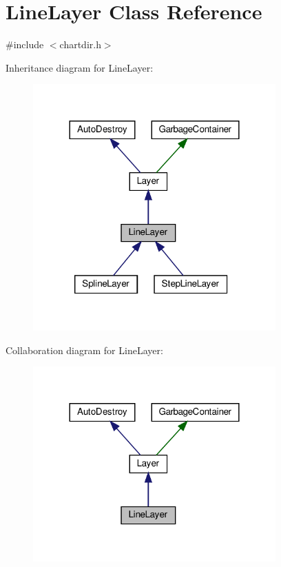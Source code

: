 \hypertarget{class_line_layer}{}\section{Line\+Layer Class Reference}
\label{class_line_layer}


{\ttfamily \#include $<$chartdir.\+h$>$}



Inheritance diagram for Line\+Layer\+:
\nopagebreak
\begin{figure}[H]
\begin{center}
\leavevmode
\includegraphics[width=264pt]{class_line_layer__inherit__graph}
\end{center}
\end{figure}


Collaboration diagram for Line\+Layer\+:
\nopagebreak
\begin{figure}[H]
\begin{center}
\leavevmode
\includegraphics[width=264pt]{class_line_layer__coll__graph}
\end{center}
\end{figure}
